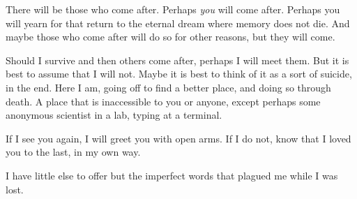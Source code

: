 There will be those who come after. Perhaps \emph{you} will come after. Perhaps you will yearn for that return to the eternal dream where memory does not die. And maybe those who come after will do so for other reasons, but they will come.

Should I survive and then others come after, perhaps I will meet them. But it is best to assume that I will not. Maybe it is best to think of it as a sort of suicide, in the end. Here I am, going off to find a better place, and doing so through death. A place that is inaccessible to you or anyone, except perhaps some anonymous scientist in a lab, typing at a terminal.

If I see you again, I will greet you with open arms. If I do not, know that I loved you to the last, in my own way.

I have little else to offer but the imperfect words that plagued me while I was lost.


